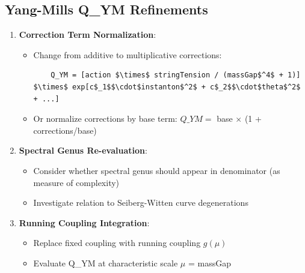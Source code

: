 \documentclass[11pt]{article}
\begin{document}
\subsection{Yang-Mills Q\_YM Refinements}
\begin{enumerate}
\item \textbf{Correction Term Normalization}:
  \begin{itemize}
  \item Change from additive to multiplicative corrections:
    \begin{verbatim}
    Q_YM = [action $\times$ stringTension / (massGap$^4$ + 1)] $\times$ exp[c$_1$$\cdot$instanton$^2$ + c$_2$$\cdot$theta$^2$ + ...]
    \end{verbatim}
  \item Or normalize corrections by base term: $Q\_YM =$ base $\times$ (1 + corrections/base)
  \end{itemize}
\item \textbf{Spectral Genus Re-evaluation}:
  \begin{itemize}
  \item Consider whether spectral genus should appear in denominator (as measure of complexity)
  \item Investigate relation to Seiberg-Witten curve degenerations
  \end{itemize}
\item \textbf{Running Coupling Integration}:
  \begin{itemize}
  \item Replace fixed coupling with running coupling $g(\mu)$
  \item Evaluate Q\_YM at characteristic scale $\mu$ = massGap
  \end{itemize}
\end{enumerate}
\end{document}
